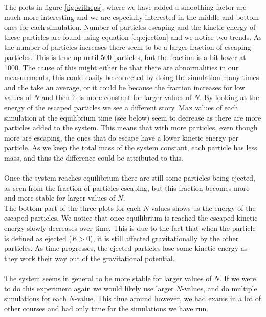 \documentclass{article}
\begin{document}
The plots in figure \ref{fig:witheps}, where we have added a smoothing factor are much more interesting and we are especially interested in the middle and bottom ones for each simulation. Number of particles escaping and the kinetic energy of these particles are found using equation \eqref{eq:ejection} and we notice two trends. As the number of particles increases there seem to be a larger fraction of escaping particles. This is true up until 500 particles, but the fraction is a bit lower at 1000. The cause of this might either be that there are abnormalities in our measurements, this could easily be corrected by doing the simulation many times and the take an average, or it could be because the fraction increases for low values of $N$ and then it is more constant for larger values of $N$. By looking at the energy of the escaped particles we see a different story. Max values of each simulation at the equilibrium time (see below) seem to decrease as there are more particles added to the system. This means that with more particles, even though more are escaping, the ones that do escape have a lower kinetic energy per particle. As we keep the total mass of the system constant, each particle has less mass, and thus the difference could be attributed to this.
\\ \\
Once the system reaches equilibrium there are still some particles being ejected, as seen from the fraction of particles escaping, but this fraction becomes more and more stable for larger values of $N$.\\
The bottom part of the three plots for each $N$-values shows us the energy of the escaped particles. We notice that once equilibrium is reached the escaped kinetic energy slowly decreases over time. This is due to the fact that when the particle is defined as ejected ($E>0$), it is still affected gravitationally by the other particles. As time progresses, the ejected particles lose some kinetic energy as they work their way out of the gravitational potential.
\\ \\
The system seems in general to be more stable for larger values of $N$. If we were to do this experiment again we would likely use larger $N$-values, and do multiple simulations for each $N$-value. This time around however, we had exams in a lot of other courses and had only time for the simulations we have run.
\\ \\
\end{document}
